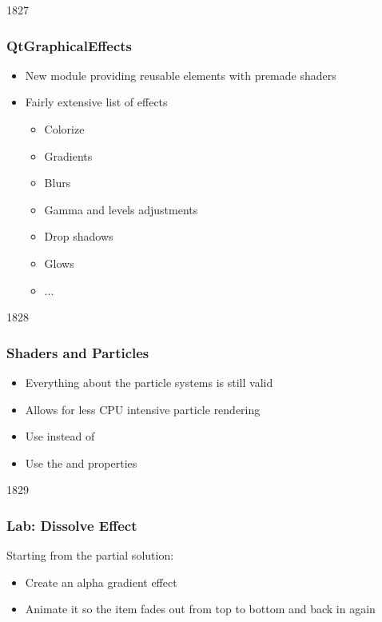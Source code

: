 \begin{slide}{1827}\frametitle{QtGraphicalEffects}

\begin{itemize}
\item New module providing reusable elements with premade shaders
\item Fairly extensive list of effects
  \begin{itemize}
  \item Colorize
  \item Gradients
  \item Blurs
  \item Gamma and levels adjustments
  \item Drop shadows
  \item Glows
  \item ...
  \end{itemize}
\end{itemize}

\end{slide}


\begin{slide}{1828}\frametitle{Shaders and Particles}

\begin{itemize}
\item Everything about the particle systems is still valid
\item Allows for less CPU intensive particle rendering

\vspace*{1em}

\item Use  instead of 
\item Use the  and  properties
\end{itemize}

\vspace*{2em}

\end{slide}


\begin{slide}{1829}\frametitle{Lab: Dissolve Effect}

Starting from the partial solution:

\begin{itemize}
\item Create an alpha gradient effect
\item Animate it so the item fades out from top to bottom and back in again
\end{itemize}

\end{slide}

